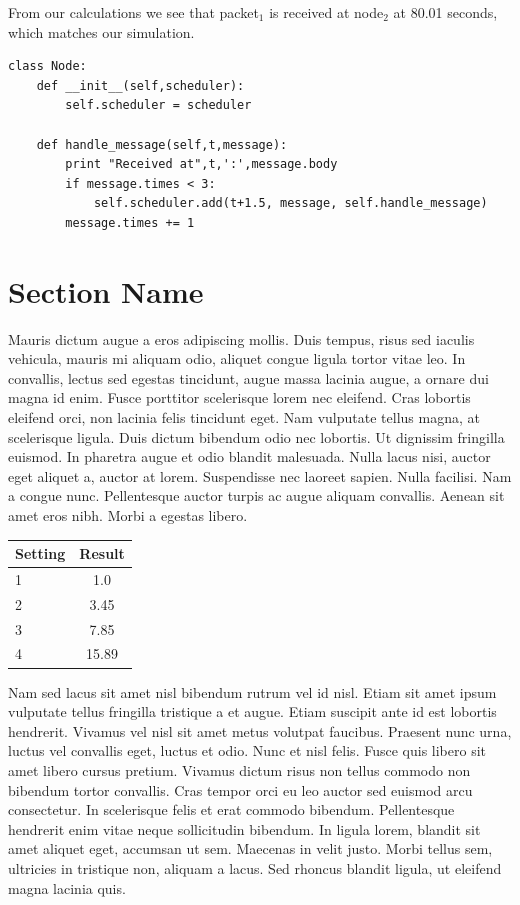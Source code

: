 \documentclass[fleqn,11pt]{article}
\begin{document}
From our calculations we see that packet$_1$ is received at node$_2$ at 80.01 seconds, which matches our simulation.

\begin{lstlisting}
class Node:
    def __init__(self,scheduler):
        self.scheduler = scheduler

    def handle_message(self,t,message):
        print "Received at",t,':',message.body
        if message.times < 3:
            self.scheduler.add(t+1.5, message, self.handle_message)
        message.times += 1
\end{lstlisting}

\section{Section Name}

Mauris dictum augue a eros adipiscing mollis. Duis tempus, risus sed
iaculis vehicula, mauris mi aliquam odio, aliquet congue ligula tortor
vitae leo. In convallis, lectus sed egestas tincidunt, augue massa
lacinia augue, a ornare dui magna id enim. Fusce porttitor scelerisque
lorem nec eleifend. Cras lobortis eleifend orci, non lacinia felis
tincidunt eget. Nam vulputate tellus magna, at scelerisque
ligula. Duis dictum bibendum odio nec lobortis. Ut dignissim fringilla
euismod. In pharetra augue et odio blandit malesuada. Nulla lacus
nisi, auctor eget aliquet a, auctor at lorem. Suspendisse nec laoreet
sapien. Nulla facilisi. Nam a congue nunc. Pellentesque auctor turpis
ac augue aliquam convallis. Aenean sit amet eros nibh. Morbi a egestas
libero.

\vspace{0.5cm}
\begin{tabular}{lc}
  \toprule
  Setting & Result\\
  \midrule
  1 & 1.0\\
  2 & 3.45\\
  3 & 7.85\\
  4 & 15.89\\
  \bottomrule
\end{tabular}
\vspace{0.5cm}

Nam sed lacus sit amet nisl bibendum rutrum vel id nisl. Etiam sit
amet ipsum vulputate tellus fringilla tristique a et augue. Etiam
suscipit ante id est lobortis hendrerit. Vivamus vel nisl sit amet
metus volutpat faucibus. Praesent nunc urna, luctus vel convallis
eget, luctus et odio. Nunc et nisl felis. Fusce quis libero sit amet
libero cursus pretium. Vivamus dictum risus non tellus commodo non
bibendum tortor convallis. Cras tempor orci eu leo auctor sed euismod
arcu consectetur. In scelerisque felis et erat commodo
bibendum. Pellentesque hendrerit enim vitae neque sollicitudin
bibendum. In ligula lorem, blandit sit amet aliquet eget, accumsan ut
sem. Maecenas in velit justo. Morbi tellus sem, ultricies in tristique
non, aliquam a lacus. Sed rhoncus blandit ligula, ut eleifend magna
lacinia quis.
\end{document}
